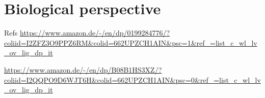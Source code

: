 \section{Biological perspective}
Refs
\url{https://www.amazon.de/-/en/dp/0199284776/?coliid=I2ZFZ3O9PPZ6RM&colid=662UPZCH1AIN&psc=1&ref_=list_c_wl_lv_ov_lig_dp_it}
    
\url{https://www.amazon.de/-/en/dp/B08B1HS3XZ/?coliid=I2QQPO9D6WJT6H&colid=662UPZCH1AIN&psc=0&ref_=list_c_wl_lv_ov_lig_dp_it}